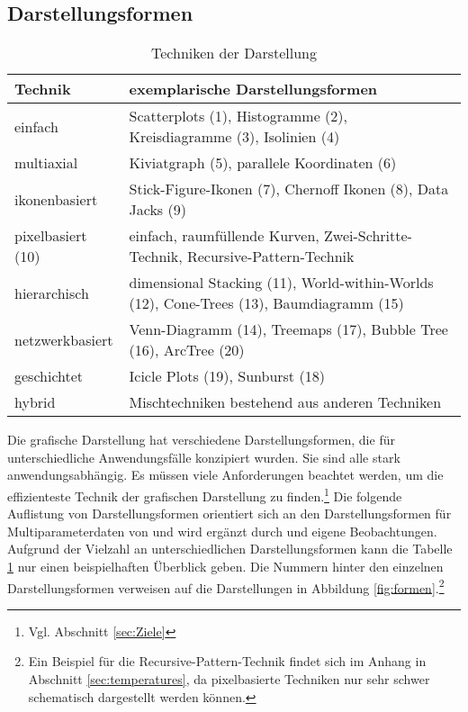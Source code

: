 \documentclass[a4paper, 
               12pt,
               DIV=calc,
               version=first,
               pdftex,
               headsepline,
               footsepline,
               bibtotocnumbered,
               liststotocnumbered]{scrreprt}
\begin{document}
\subsection{Darstellungsformen}
\label{sec:Darstellungsformen}
\begin{table}
\centering
\begin{tabular}{|l|p{10cm}|}
\hline
\textbf{Technik} & \textbf{exemplarische Darstellungsformen}\\
\hline
einfach & Scatterplots (1), Histogramme (2), Kreisdiagramme (3), Isolinien (4)\\
\hline
multiaxial & Kiviatgraph (5), parallele Koordinaten (6)\\
\hline
ikonenbasiert & Stick-Figure-Ikonen (7), Chernoff Ikonen (8), Data Jacks (9)\\
\hline
pixelbasiert (10) &
einfach, raumfüllende Kurven, Zwei-Schritte-Technik, Recursive-Pattern-Technik\\
\hline
hierarchisch & dimensional Stacking (11), World-within-Worlds (12), Cone-Trees (13), Baumdiagramm (15)\\
\hline
netzwerkbasiert & Venn-Diagramm (14), Treemaps (17), Bubble Tree (16), ArcTree (20)\\
\hline
geschichtet & Icicle Plots (19), Sunburst (18)\\
\hline
hybrid & Mischtechniken bestehend aus anderen Techniken\\
\hline
\end{tabular}
\caption{Techniken der Darstellung}
\label{tab:darstellungsformen}
\end{table}

Die grafische Darstellung hat verschiedene Darstellungsformen, die für unterschiedliche
Anwendungsfälle konzipiert wurden. Sie sind alle stark anwendungsabhängig. Es müssen viele
Anforderungen beachtet werden, um die effizienteste Technik der grafischen Darstellung zu
finden.\footnote{Vgl. Abschnitt \ref{sec:Ziele}}
Die folgende Auflistung von Darstellungsformen orientiert sich an den Darstellungsformen für
Multiparameterdaten von \cite{Schumann} und
wird ergänzt durch \cite{Preim} und eigene Beobachtungen. Aufgrund der Vielzahl an unterschiedlichen
Darstellungsformen kann die Tabelle \ref{tab:darstellungsformen} nur einen beispielhaften Überblick geben. Die
Nummern hinter den einzelnen Darstellungsformen verweisen auf die Darstellungen in 
Abbildung \ref{fig:formen}.\footnote{Ein Beispiel für die Recursive-Pattern-Technik
findet sich im Anhang in Abschnitt \ref{sec:temperatures}, da pixelbasierte
Techniken nur sehr schwer schematisch dargestellt werden können.}
\end{document}
